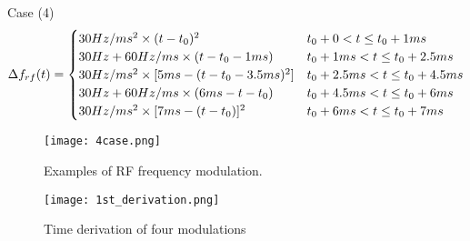Case (4) 
\begin{eqnarray}\Delta f_{rf}(t)=
\begin{cases}
30Hz/ms^2 \times (t-t_0)^2 &t_0+0<t\le t_0+1ms\cr  
30Hz + 60Hz/ms\times (t-t_0 -1ms) &t_0+1ms<t\le t_0+2.5ms\cr 
30Hz/ms^2 \times [5ms-(t-t_0-3.5ms)^2] &t_0+2.5ms<t\le t_0+4.5ms\cr  
30Hz + 60Hz/ms\times (6ms-t-t_0) &t_0+4.5ms<t\le t_0+6ms\cr  
30Hz/ms^2 \times [7ms-(t-t_0)]^2 &t_0+6ms<t\le t_0+7ms\cr  
\end{cases}
\end{eqnarray}

\begin{figure}[!htb]
   \centering   
   \texttt{[image: 4case.png]}
   \caption{Examples of RF frequency modulation.}
   \label{4case}
\end{figure}

\begin{figure}[!htb]
   \centering   
   \texttt{[image: 1st\_derivation.png]}
   \caption{Time derivation of four modulations}
   \label{1st_derivation}
\end{figure}
